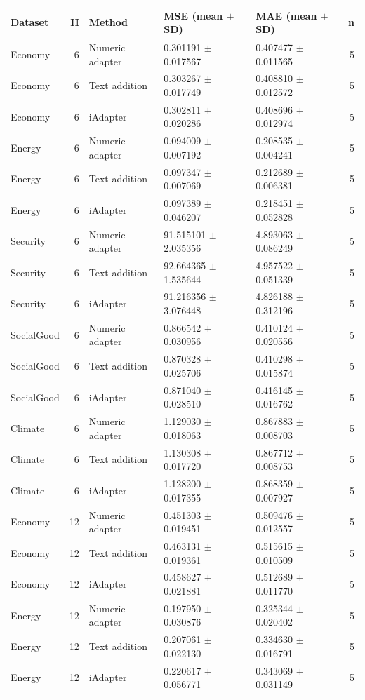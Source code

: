 \begin{tabular}{lrlllr}
\toprule
Dataset & H & Method & MSE (mean $\pm$ SD) & MAE (mean $\pm$ SD) & n \\
\midrule
Economy & 6 & Numeric adapter & 0.301191 $\pm$ 0.017567 & 0.407477 $\pm$ 0.011565 & 5 \\
Economy & 6 & Text addition & 0.303267 $\pm$ 0.017749 & 0.408810 $\pm$ 0.012572 & 5 \\
Economy & 6 & iAdapter & 0.302811 $\pm$ 0.020286 & 0.408696 $\pm$ 0.012974 & 5 \\
Energy & 6 & Numeric adapter & 0.094009 $\pm$ 0.007192 & 0.208535 $\pm$ 0.004241 & 5 \\
Energy & 6 & Text addition & 0.097347 $\pm$ 0.007069 & 0.212689 $\pm$ 0.006381 & 5 \\
Energy & 6 & iAdapter & 0.097389 $\pm$ 0.046207 & 0.218451 $\pm$ 0.052828 & 5 \\
Security & 6 & Numeric adapter & 91.515101 $\pm$ 2.035356 & 4.893063 $\pm$ 0.086249 & 5 \\
Security & 6 & Text addition & 92.664365 $\pm$ 1.535644 & 4.957522 $\pm$ 0.051339 & 5 \\
Security & 6 & iAdapter & 91.216356 $\pm$ 3.076448 & 4.826188 $\pm$ 0.312196 & 5 \\
SocialGood & 6 & Numeric adapter & 0.866542 $\pm$ 0.030956 & 0.410124 $\pm$ 0.020556 & 5 \\
SocialGood & 6 & Text addition & 0.870328 $\pm$ 0.025706 & 0.410298 $\pm$ 0.015874 & 5 \\
SocialGood & 6 & iAdapter & 0.871040 $\pm$ 0.028510 & 0.416145 $\pm$ 0.016762 & 5 \\
Climate & 6 & Numeric adapter & 1.129030 $\pm$ 0.018063 & 0.867883 $\pm$ 0.008703 & 5 \\
Climate & 6 & Text addition & 1.130308 $\pm$ 0.017720 & 0.867712 $\pm$ 0.008753 & 5 \\
Climate & 6 & iAdapter & 1.128200 $\pm$ 0.017355 & 0.868359 $\pm$ 0.007927 & 5 \\
Economy & 12 & Numeric adapter & 0.451303 $\pm$ 0.019451 & 0.509476 $\pm$ 0.012557 & 5 \\
Economy & 12 & Text addition & 0.463131 $\pm$ 0.019361 & 0.515615 $\pm$ 0.010509 & 5 \\
Economy & 12 & iAdapter & 0.458627 $\pm$ 0.021881 & 0.512689 $\pm$ 0.011770 & 5 \\
Energy & 12 & Numeric adapter & 0.197950 $\pm$ 0.030876 & 0.325344 $\pm$ 0.020402 & 5 \\
Energy & 12 & Text addition & 0.207061 $\pm$ 0.022130 & 0.334630 $\pm$ 0.016791 & 5 \\
Energy & 12 & iAdapter & 0.220617 $\pm$ 0.056771 & 0.343069 $\pm$ 0.031149 & 5 \\
\bottomrule
\end{tabular}
